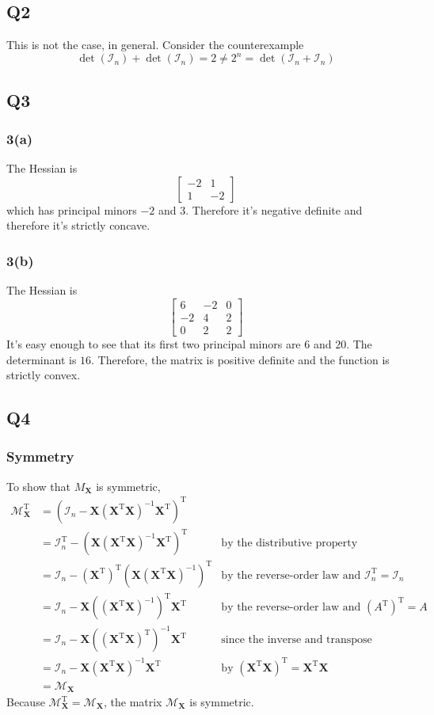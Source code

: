 \documentclass{article}
\newcommand{\I}{\mathcal{I}}
\newcommand{\X}{\mathbf{X}}
\newcommand{\tp}{^{\mathrm T}}
\begin{document}
\subsection*{Q2}
This is not the case, in general.
Consider the counterexample \[\det(\I_{n})+\det(\I_{n})=2\ne 2^n=\det(\I_{n}+\I_{n})\]
\subsection*{Q3}
\subsubsection*{3(a)} The Hessian is 
\[
 \begin{bmatrix} -2 & 1 \\ 1 & -2 \end{bmatrix}
\] which has principal minors $-2$ and $3$. Therefore it's negative definite and therefore it's strictly concave.


\subsubsection*{3(b)} The Hessian is 
\[
 \begin{bmatrix} 6 & -2 & 0 \\  -2 & 4 & 2 \\ 0 & 2 & 2  \end{bmatrix}
\]
It's easy enough to see that its first two principal minors are $6$ and $20$. The determinant is $16$.
Therefore, the matrix is positive definite and the function is strictly convex.

\subsection*{Q4}

\subsubsection*{Symmetry}

To show that $M_{\X}$ is symmetric,
\begin{align*}
    \mathcal M_{\X}\tp&=(\I_n-\X(\X\tp\X)^{-1}\X\tp)\tp\\
    &=\I_n\tp-(\X(\X\tp\X)^{-1}\X\tp)\tp&\text{by the distributive property}\\
    &=\I_n-(\X\tp)\tp(\X(\X\tp\X)^{-1})\tp&\text{by the reverse-order law and }\I_n\tp=\I_n\\
    &=\I_n-\X((\X\tp\X)^{-1})\tp\X\tp&\text{by the reverse-order law and }(A\tp)\tp=A\\
    &=\I_n-\X((\X\tp\X)\tp)^{-1}\X\tp&\text{since the inverse and transpose commute}\\
    &=\I_n-\X(\X\tp\X)^{-1}\X\tp&\text{by }(\X\tp\X)\tp=\X\tp\X\\
    &=\mathcal M_{\X}
\end{align*}
Because $\mathcal M_{\X}\tp=\mathcal M_{\X}$, the matrix $\mathcal M_{\X}$ is symmetric.
\end{document}
